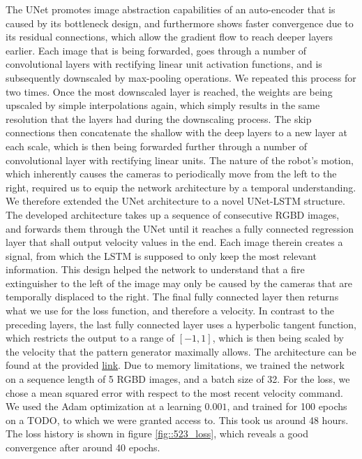 The UNet promotes image abstraction capabilities of an auto-encoder that is caused by its bottleneck design, and furthermore shows faster convergence due to its residual connections, which allow the gradient flow to reach deeper layers earlier. Each image that is being forwarded, goes through a number of convolutional layers with rectifying linear unit activation functions, and is subsequently downscaled by max-pooling operations. We repeated this process for two times. Once the most downscaled layer is reached, the weights are being upscaled by simple interpolations again, which simply results in the same resolution that the layers had during the downscaling process. The skip connections then concatenate the shallow with the deep layers to a new layer at each scale, which is then being forwarded further through a number of convolutional layer with rectifying linear units. The nature of the robot's motion, which inherently causes the cameras to periodically move from the left to the right, required us to equip the network architecture by a temporal understanding. We therefore extended the UNet architecture to a novel UNet-LSTM structure. The developed architecture takes up a sequence of consecutive RGBD images, and forwards them through the UNet until it reaches a fully connected regression layer that shall output velocity values in the end. Each image therein creates a signal, from which the LSTM is supposed to only keep the most relevant information. This design helped the network to understand that a fire extinguisher to the left of the image may only be caused by the cameras that are temporally displaced to the right. The final fully connected layer then returns what we use for the loss function, and therefore a velocity. In contrast to the preceding layers, the last fully connected layer uses a hyperbolic tangent function, which restricts the output to a range of $[-1,1]$, which is then being scaled by the velocity that the pattern generator maximally allows. The architecture can be found at the provided \href{https://github.com/mhubii/nmpc_pattern_generator/blob/master/libs/learning/python/unet_model.py}{link}. Due to memory limitations, we trained the network on a sequence length of 5 RGBD images, and a batch size of 32. For the loss, we chose a mean squared error with respect to the most recent velocity command. We used the Adam optimization \cite{kingma2014adam} at a learning $0.001$, and trained for 100 epochs on a TODO, to which we were granted access to. This took us around 48 hours. The loss history is shown in figure \ref{fig::523_loss}, which reveals a good convergence after around 40 epochs.
